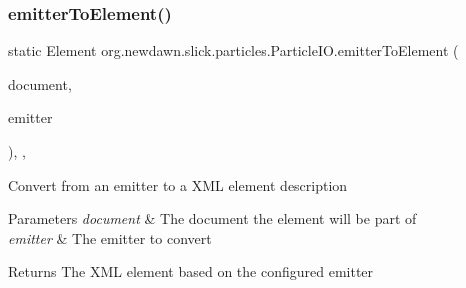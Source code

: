 \subsubsection{\texorpdfstring{emitter\+To\+Element()}{emitterToElement()}}
{\footnotesize\ttfamily static Element org.\+newdawn.\+slick.\+particles.\+Particle\+I\+O.\+emitter\+To\+Element (\begin{DoxyParamCaption}\item[{Document}]{document,  }\item[{\mbox{\hyperlink{classorg_1_1newdawn_1_1slick_1_1particles_1_1_configurable_emitter}{Configurable\+Emitter}}}]{emitter }\end{DoxyParamCaption})\hspace{0.3cm}{\ttfamily [inline]}, {\ttfamily [static]}, {\ttfamily [private]}}

Convert from an emitter to a X\+ML element description


\begin{DoxyParams}{Parameters}
{\em document} & The document the element will be part of \\
\hline
{\em emitter} & The emitter to convert \\
\hline
\end{DoxyParams}
\begin{DoxyReturn}{Returns}
The X\+ML element based on the configured emitter 
\end{DoxyReturn}

